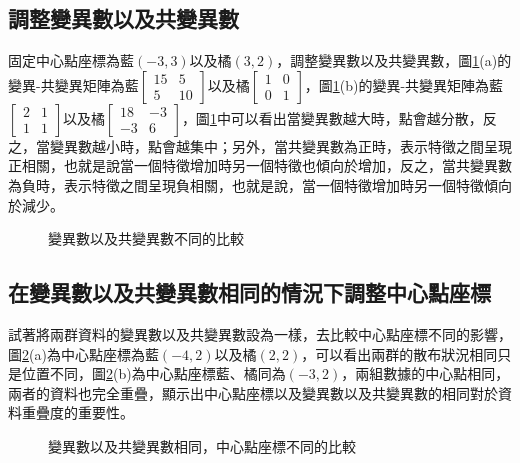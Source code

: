 \documentclass[12pt, a4paper]{article}
\begin{document}
\subsection{調整變異數以及共變異數}
固定中心點座標為藍\;$(-3,3)$\;以及橘\;$(3,2)$\;，調整變異數以及共變異數，圖\;\ref{fig:parallel4_2}\;(a)\;的變異\;-\;共變異矩陣為藍\;$\begin{bmatrix}15 & 5 \\5 & 10 \end{bmatrix}$\;以及橘\;$\begin{bmatrix}1 & 0\\0 & 1 \end{bmatrix}$\;，圖\;\ref{fig:parallel4_2}\;(b)\;的變異\;-\;共變異矩陣為藍\;$\begin{bmatrix}2 & 1 \\1 & 1 \end{bmatrix}$\;以及橘\;$\begin{bmatrix}18 & -3\\-3 & 6 \end{bmatrix}$\;，圖\;\ref{fig:parallel4_2}\;中可以看出當變異數越大時，點會越分散，反之，當變異數越小時，點會越集中；另外，當共變異數為正時，表示特徵之間呈現正相關，也就是說當一個特徵增加時另一個特徵也傾向於增加，反之，當共變異數為負時，表示特徵之間呈現負相關，也就是說，當一個特徵增加時另一個特徵傾向於減少。

\begin{figure}[h]
\centering
{}
\caption{變異數以及共變異數不同的比較}
\label{fig:parallel4_2}
\end{figure}

\subsection{在變異數以及共變異數相同的情況下調整中心點座標}
試著將兩群資料的變異數以及共變異數設為一樣，去比較中心點座標不同的影響，圖\;\ref{fig:parallel4_3}\;(a)\;為中心點座標為藍\;$(-4,2)$\;以及橘\;$(2,2)$\;，可以看出兩群的散布狀況相同只是位置不同，圖\;\ref{fig:parallel4_3}\;(b)\;為中心點座標藍、橘同為\;$(-3,2)$\;，兩組數據的中心點相同，兩者的資料也完全重疊，顯示出中心點座標以及變異數以及共變異數的相同對於資料重疊度的重要性。

\begin{figure}[h]
\centering
{}
\caption{變異數以及共變異數相同，中心點座標不同的比較}
\label{fig:parallel4_3}
\end{figure}
\end{document}
